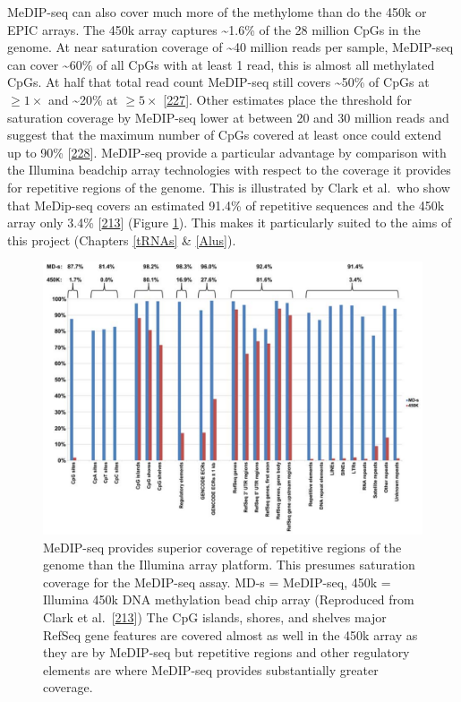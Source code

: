 \documentclass[
]{book}
\begin{document}
MeDIP-seq can also cover much more of the methylome than do the 450k or EPIC arrays.
The 450k array captures \textasciitilde1.6\% of the 28 million CpGs in the genome.
At near saturation coverage of \textasciitilde40 million reads per sample, MeDIP-seq can cover \textasciitilde60\% of all CpGs with at least 1 read, this is almost all methylated CpGs.
At half that total read count MeDIP-seq still covers \textasciitilde50\% of CpGs at \(\ge1\times\) and \textasciitilde20\% at \(\ge5\times\) {[}\protect\hyperlink{ref-Taiwo2012}{227}{]}.
Other estimates place the threshold for saturation coverage by MeDIP-seq lower at between 20 and 30 million reads and suggest that the maximum number of CpGs covered at least once could extend up to 90\% {[}\protect\hyperlink{ref-Chavez2010}{228}{]}.
MeDIP-seq provide a particular advantage by comparison with the Illumina beadchip array technologies with respect to the coverage it provides for repetitive regions of the genome.
This is illustrated by Clark et al.~who show that MeDip-seq covers an estimated 91.4\% of repetitive sequences and the 450k array only 3.4\% {[}\protect\hyperlink{ref-Clark2012}{213}{]} (Figure \ref{fig:Clark2012fig1}).
This makes it particularly suited to the aims of this project (Chapters \ref{tRNAs} \& \ref{Alus}).

\begin{figure}

{\centering \includegraphics[width=0.9\linewidth]{figs/Clark2012fig1MeDIPseqVs450Kcoverage} 

}

\caption{MeDIP-seq provides superior coverage of repetitive regions of the genome than the Illumina array platform. This presumes saturation coverage for the MeDIP-seq assay. MD-s = MeDIP-seq, 450k = Illumina 450k DNA methylation bead chip array (Reproduced from Clark et al.~{[}\protect\hyperlink{ref-Clark2012}{213}{]}) The CpG islands, shores, and shelves major RefSeq gene features are covered almost as well in the 450k array as they are by MeDIP-seq but repetitive regions and other regulatory elements are where MeDIP-seq provides substantially greater coverage.}\label{fig:Clark2012fig1}
\end{figure}
\end{document}

